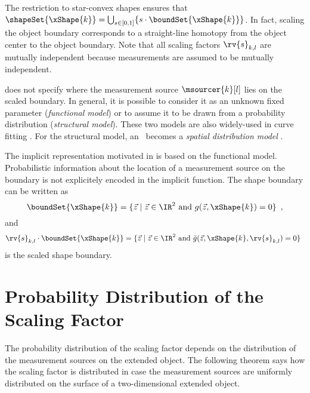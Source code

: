 \documentclass[preprint,1p,11pt]{ISAS_IR}
\begin{document}
 The restriction to star-convex shapes ensures that  $ \shapeSet{\xShape{k}} = \bigcup_{s \in [0,1]}\{ s \cdot \boundSet{\xShape{k}} \}$. In fact, scaling the object boundary corresponds to   a straight-line homotopy from the object center to the object boundary.
Note that all scaling factors  $\rv{s}_{k,l}$  are mutually  independent because measurements are assumed to be mutually independent.
 
 does not specify where the measurement source $\msourcer{k}[l]$ lies on the scaled boundary.
In general, it is possible to consider it as an unknown fixed parameter  (\emph{functional model}) or to assume  it to be drawn from a probability distribution (\emph{structural model}). These two models are also widely-used  in curve fitting \cite{Chernov2009}.
For the structural model, an \rhm\ becomes a \emph{spatial distribution model} \cite{Gilholm2005,G2005}.


 \begin{Remark} The implicit representation motivated in  is based on  the functional model. Probabilistic information about the location of a  measurement source on the boundary is not explicitely encoded in the implicit function.
  The shape boundary can be written as
 \begin{equation}
  \boundSet{\xShape{k}} =\{ \vec{z} \; | \; \vec{z} \in \IR^2 \text{ and }    g(\vec{z},\xShape{k})  = 0   \} \enspace,  
     \end{equation}
     and
     \begin{equation}
     \rv{s}_{k,l}\cdot  \boundSet{\xShape{k}} = \{ \vec{z} \; | \; \vec{z} \in \IR^2 \text{ and }    \tilde{g}(\vec{z},\xShape{k},\rv{s}_{k,l})  = 0   \} \enspace 
     \end{equation}
   is the scaled shape boundary.
  \end{Remark}

 
 




\section{Probability Distribution of the Scaling Factor} 
The probability distribution of the scaling factor depends on the distribution of the measurement sources on the extended object.
The following theorem  says how the scaling factor is distributed in case the measurement sources are uniformly distributed on the surface of a two-dimensional extended object.
 
\end{document}

